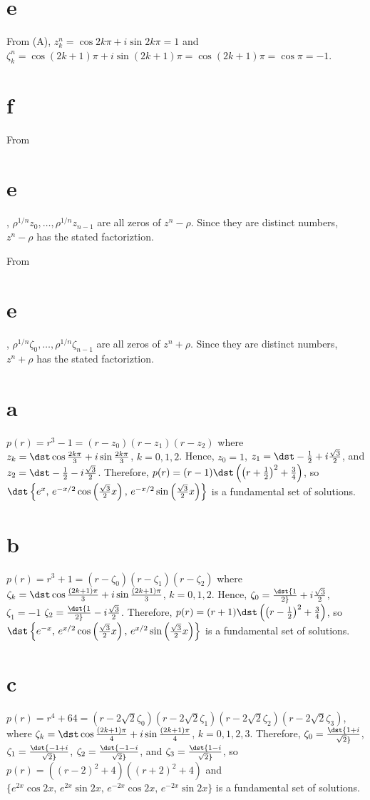 \documentclass[dvips]{book}
\renewcommand{\exer}[1]{\par\medskip\;\noindent{\color{red}\bf #1.}}
\numberwithin{example}{section}
\numberwithin{equation}{section}
\numberwithin{theorem}{section}
\numberwithin{table}{section}
\numberwithin{figure}{section}
\begin{document}
\part{e}  From (A), $z_k^n=\cos2k\pi+i\sin2k\pi=1$ and
$\zeta_k^n=\cos(2k+1)\pi+i\sin(2k+1)\pi=\cos(2k+1)\pi=\cos\pi=-1$.

\part{f} From \part{e}, $\rho^{1/n}z_0,\dots,\rho^{1/n}z_{n-1}$
are all zeros of $z^n-\rho$. Since they are distinct numbers,
$z^n-\rho$ has the stated factoriztion.

 From \part{e}, $\rho^{1/n}\zeta_0,\dots,\rho^{1/n}\zeta_{n-1}$
are all zeros of $z^n+\rho$. Since they are distinct numbers,
$z^n+\rho$ has the stated factoriztion.

\exer{9.2.43}
\part{a}
$p(r)=r^3-1=(r-z_0)(r-z_1)(r-z_2)$ where
$z_k=\dst\cos{2k\pi\over3}+i\sin{2k\pi\over3}$, $k=0,1,2$. Hence,
$z_0=1$, $z_1=\dst-{1\over2}+i{\sqrt3\over2}$, and
$z_2=\dst-{1\over2}-i{\sqrt3\over2}$. Therefore,
$p(r)=(r-1)\dst\left(\left(r+{1\over2}\right)^2+{3\over4}\right)$,
so
$\dst\left\{e^x,\,e^{-x/2}\cos\left({\sqrt3\over2}x\right),
\,e^{-x/2}\sin\left({\sqrt3\over2}x\right)\right\}$
is a fundamental set of solutions.


\part{b}
$p(r)=r^3+1=(r-\zeta_0)(r-\zeta_1)(r-\zeta_2)$ where
$\zeta_k=\dst\cos{(2k+1)\pi\over3}+i\sin{(2k+1)\pi\over3}$, $k=0,1,2$.
Hence,
 $\zeta_0=\dst{1\over2}+i{\sqrt3\over2}$, $\zeta_1=-1$
$\zeta_2=\dst{1\over2}-i{\sqrt3\over2}$. Therefore,
$p(r)=(r+1)\dst\left(\left(r-{1\over2}\right)^2+{3\over4}\right)$,
so
 $\dst\left\{e^{-x},\,e^{x/2}\cos\left({\sqrt3\over2}x\right),
\,e^{x/2}\sin\left({\sqrt3\over2}x\right)\right\}$
is a fundamental set of solutions.


\part{c}
$p(r)=r^4+64=(r-2\sqrt2\zeta_0)(r-2\sqrt2\zeta_1)
(r-2\sqrt2\zeta_2)(r-2\sqrt2\zeta_3)$,
where
$\zeta_k=\dst\cos{(2k+1)\pi\over4}+i\sin{(2k+1)\pi\over4}$,
$k=0,1,2,3$. Therefore,
$\zeta_0=\dst{1+i\over\sqrt2}$,
$\zeta_1=\dst{-1+i\over\sqrt2}$,
$\zeta_2=\dst{-1-i\over\sqrt2}$,
and $\zeta_3=\dst{1-i\over\sqrt2}$, so
 $p(r)=((r-2)^2+4)((r+2)^2+4)$ and
$\{e^{2x}\cos2x,\,e^{2x}\sin2x,\,e^{-2x}\cos2x,\,e^{-2x}\sin2x\}$
is a fundamental set of solutions.
\end{document}
